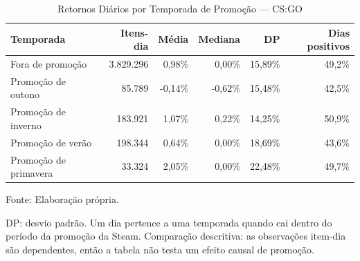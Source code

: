 \begin{table}[H]
\caption{Retornos Diários por Temporada de Promoção — CS:GO}\label{tab:sale_seasons} 

\fontsize{12.0pt}{14.4pt}\selectfont

\begin{tabular*}{\linewidth}{@{\extracolsep{\fill}}lrrrrr}
\toprule
\textbf{Temporada} & \textbf{Itens-dia} & \textbf{Média} & \textbf{Mediana} & \textbf{DP} & \textbf{Dias positivos} \\
\midrule\addlinespace[2.5pt]
Fora de promoção & 3.829.296 & 0,98\% & 0,00\% & 15,89\% & 49,2\% \\
Promoção de outono & 85.789 & -0,14\% & -0,62\% & 15,48\% & 42,5\% \\
Promoção de inverno & 183.921 & 1,07\% & 0,22\% & 14,25\% & 50,9\% \\
Promoção de verão & 198.344 & 0,64\% & 0,00\% & 18,69\% & 43,6\% \\
Promoção de primavera & 33.324 & 2,05\% & 0,00\% & 22,48\% & 49,7\% \\
\bottomrule
\end{tabular*}
\par\vspace{\belowcaptionskip}\footnotesize Fonte: Elaboração própria.\par
\begin{minipage}{\linewidth}
DP: desvio padrão. Um dia pertence a uma temporada quando cai dentro do período da promoção da Steam. Comparação descritiva: as observações item-dia são dependentes, então a tabela não testa um efeito causal de promoção.\\
\end{minipage}
\end{table}
